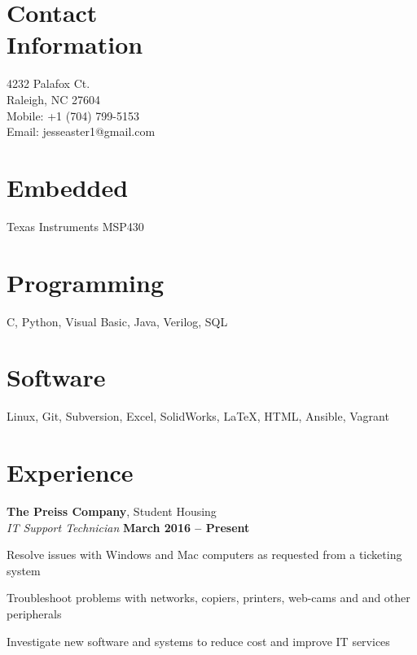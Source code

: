 \documentclass[margin,line]{resume}
\begin{document}
\begin{resume}

    \section{\mysidestyle Contact\\Information}

    4232 Palafox Ct.
    \\
    Raleigh, NC 27604
    \\
    Mobile: +1 (704) 799-5153
    \\
    Email: jesseaster1@gmail.com



    \section{\mysidestyle Embedded}
    Texas Instruments MSP430
    \vspace{-5mm}
    
    \section{\mysidestyle Programming}
    C, Python, Visual Basic, Java, Verilog, SQL
    \vspace{-5mm}

    \section{\mysidestyle Software}
    Linux, Git, Subversion, Excel, SolidWorks, \LaTeX, HTML, Ansible, Vagrant

    \section{\mysidestyle Experience}


    \textbf{The Preiss Company}, Student Housing\\
    \textsl{IT Support Technician}  \hfill \textbf{March 2016 -- Present}\\
    \vspace{-4mm}
    \begin{list2}
    \item Resolve issues with Windows and Mac computers as requested from a ticketing system
    \item Troubleshoot problems with networks, copiers, printers, web-cams and and other peripherals
    \item Investigate new software and systems to reduce cost and improve IT services
    \end{list2}
    \vspace{3mm}





\end{resume}
\end{document}
